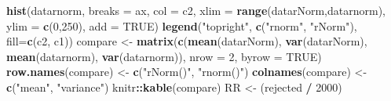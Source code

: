 \documentclass[
]{article}
\newenvironment{Shaded}{\begin{snugshade}}{\end{snugshade}}
\newcommand{\DataTypeTok}[1]{\textcolor[rgb]{0.13,0.29,0.53}{#1}}
\newcommand{\DecValTok}[1]{\textcolor[rgb]{0.00,0.00,0.81}{#1}}
\newcommand{\KeywordTok}[1]{\textcolor[rgb]{0.13,0.29,0.53}{\textbf{#1}}}
\newcommand{\NormalTok}[1]{#1}
\newcommand{\OperatorTok}[1]{\textcolor[rgb]{0.81,0.36,0.00}{\textbf{#1}}}
\newcommand{\OtherTok}[1]{\textcolor[rgb]{0.56,0.35,0.01}{#1}}
\newcommand{\StringTok}[1]{\textcolor[rgb]{0.31,0.60,0.02}{#1}}
\begin{document}
\begin{Shaded}
\begin{Highlighting}[]
\KeywordTok{hist}\NormalTok{(datarnorm, }\DataTypeTok{breaks =}\NormalTok{ ax, }\DataTypeTok{col =}\NormalTok{ c2,  }\DataTypeTok{xlim =} \KeywordTok{range}\NormalTok{(datarNorm,datarnorm),  }\DataTypeTok{ylim =} \KeywordTok{c}\NormalTok{(}\DecValTok{0}\NormalTok{,}\DecValTok{250}\NormalTok{), }\DataTypeTok{add =} \OtherTok{TRUE}\NormalTok{)}
\KeywordTok{legend}\NormalTok{(}\StringTok{"topright"}\NormalTok{, }\KeywordTok{c}\NormalTok{(}\StringTok{"rnorm"}\NormalTok{, }\StringTok{"rNorm"}\NormalTok{), }\DataTypeTok{fill=}\KeywordTok{c}\NormalTok{(c2, c1))}
\NormalTok{compare <-}\StringTok{ }\KeywordTok{matrix}\NormalTok{(}\KeywordTok{c}\NormalTok{(}\KeywordTok{mean}\NormalTok{(datarNorm), }\KeywordTok{var}\NormalTok{(datarNorm), }\KeywordTok{mean}\NormalTok{(datarnorm), }\KeywordTok{var}\NormalTok{(datarnorm)), }\DataTypeTok{nrow =} \DecValTok{2}\NormalTok{, }\DataTypeTok{byrow =} \OtherTok{TRUE}\NormalTok{)}
\KeywordTok{row.names}\NormalTok{(compare) <-}\StringTok{ }\KeywordTok{c}\NormalTok{(}\StringTok{"rNorm()"}\NormalTok{, }\StringTok{"rnorm()"}\NormalTok{)}
\KeywordTok{colnames}\NormalTok{(compare) <-}\StringTok{ }\KeywordTok{c}\NormalTok{(}\StringTok{"mean"}\NormalTok{, }\StringTok{"variance"}\NormalTok{)}
\NormalTok{knitr}\OperatorTok{::}\KeywordTok{kable}\NormalTok{(compare)}
\NormalTok{RR <-}\StringTok{ }\NormalTok{(rejected }\OperatorTok{/}\StringTok{ }\DecValTok{2000}\NormalTok{) }
\end{Highlighting}
\end{Shaded}
\end{document}
